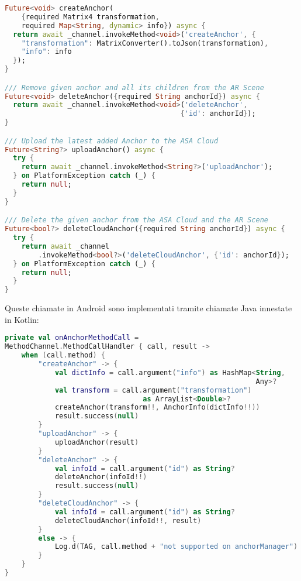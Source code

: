 \begin{lstlisting}[language=dart, label={lst:arplug_manager}, firstnumber=1,caption={\aplug{} \textit{create, delete, ulpoad, delete cloud anchor} tramite \textit{method channel}}]
Future<void> createAnchor(
    {required Matrix4 transformation,
    required Map<String, dynamic> info}) async {
  return await _channel.invokeMethod<void>('createAnchor', {
    "transformation": MatrixConverter().toJson(transformation),
    "info": info
  });
}

/// Remove given anchor and all its children from the AR Scene
Future<void> deleteAnchor({required String anchorId}) async {
  return await _channel.invokeMethod<void>('deleteAnchor',
                                          {'id': anchorId});
}

/// Upload the latest added Anchor to the ASA Cloud
Future<String?> uploadAnchor() async {
  try {
    return await _channel.invokeMethod<String?>('uploadAnchor');
  } on PlatformException catch (_) {
    return null;
  }
}

/// Delete the given anchor from the ASA Cloud and the AR Scene
Future<bool?> deleteCloudAnchor({required String anchorId}) async {
  try {
    return await _channel
        .invokeMethod<bool?>('deleteCloudAnchor', {'id': anchorId});
  } on PlatformException catch (_) {
    return null;
  }
}
\end{lstlisting} 

Queste chiamate in Android sono implementati tramite chiamate Java innestate in Kotlin:

\begin{lstlisting}[language=Kotlin, label={lst:android_channels}, firstnumber=1,caption={Android chiamate dei \textit{method channel} per effettuare \textit{create, delete, ulpoad, delete cloud anchor}}]
private val onAnchorMethodCall =
MethodChannel.MethodCallHandler { call, result ->
    when (call.method) {
        "createAnchor" -> {
            val dictInfo = call.argument("info") as HashMap<String,
                                                            Any>?
            val transform = call.argument("transformation") 
                                 as ArrayList<Double>?
            createAnchor(transform!!, AnchorInfo(dictInfo!!))
            result.success(null)
        }
        "uploadAnchor" -> {
            uploadAnchor(result)
        }
        "deleteAnchor" -> {
            val infoId = call.argument("id") as String?
            deleteAnchor(infoId!!)
            result.success(null)
        }
        "deleteCloudAnchor" -> {
            val infoId = call.argument("id") as String?
            deleteCloudAnchor(infoId!!, result)
        }
        else -> {
            Log.d(TAG, call.method + "not supported on anchorManager")
        }
    }
}
\end{lstlisting}

